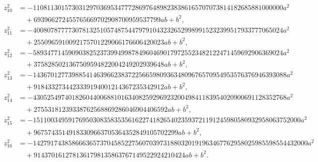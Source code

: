\documentclass[11pt, a4paper]{amsart}
\theoremstyle{definition}
\begin{document}
{\begin{align*}
		z_{10}^2 & = -11081130157303129703695347772869764898238386165707073814182685881000000 a^2\\
		& \quad +693966272455765669702908700959537799 ab +b^2,  \\
		z_{11}^2 & =  -40080787777307813251057487544797910432326529989915232399517933777065024 a^2\\
		& \quad +2550965910092175701229066176606420023 ab + b^2,  \\
		z_{12}^2 & = -58934771459090382523739949987849604690179725523482122471459692906369024 a^2 \\
		& \quad+3758285021367509594822004249202939648 ab + b^2, \\
		z_{13}^2 & =  -143670127739885414639662383722566598093634809676570954953576376946393088 a^2\\
		& \quad +9184332734423339194001214367235342912 ab + b^2,  \\
		z_{14}^2 & = -430525497401826044006881016340825929692320049841183954020900691128352768 a^2 \\
		& \quad+27553181239338762568869286046904406592 ab + b^2, \\
		z_{15}^2 & =-1511003495917695030835835356162274182654023593721191245980580932958063752000a^2\\ & \quad+96757435149183309663705364352849105702299 ab + b^2, \\
		z_{16}^2 & = -142791743858666365737045852275607039731880320191963467762958025985598554432000a^2\\
		& \quad +9143701612781361798135863767149522924210424 ab +b^2.
\end{align*}}
%
\end{document}
